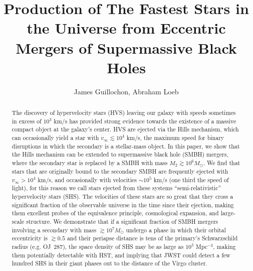\documentclass[a4paper,twocolumn]{emulateapj}
\begin{document}


\title{Production of The Fastest Stars in the Universe from Eccentric Mergers of Supermassive Black Holes}

\author{James Guillochon, Abraham Loeb}


\begin{abstract} 
The discovery of hypervelocity stars (HVS) leaving our galaxy with speeds sometimes in excess of $10^{3}$ km/s has provided strong evidence towards the existence of a massive compact object at the galaxy's center. HVS are ejected via the Hills mechanism, which can occasionally yield a star with $v_{\infty} \lesssim 10^4$ km/s, the maximum speed for binary disruptions in which the secondary is a stellar-mass object. In this paper, we show that the Hills mechanism can be extended to supermassive black hole (SMBH) mergers, where the secondary star is replaced by a SMBH with mass $M_2 \gtrsim 10^6 M_{\odot}$. We find that stars that are originally bound to the secondary SMBH are frequently ejected with $v_{\infty} > 10^4$ km/s, and occasionally with velocities $\sim 10^5$ km/s (one third the speed of light), for this reason we call stars ejected from these systems ``semi-relativistic'' hypervelocity stars (SHS). The velocities of these stars are so great that they cross a significant fraction of the observable universe in the time since their ejection, making them excellent probes of the equivalence principle, cosmological expansion, and large-scale structure. We demonstrate that if a significant fraction of SMBH mergers involving a secondary with mass $\gtrsim 10^7 M_\odot$ undergo a phase in which their orbital eccentricity is $\gtrsim 0.5$ and their periapse distance is tens of the primary's Schwarzschild radius (e.g. OJ~287), the space density of SHS may be as large as $10^{3}$ Mpc$^{-3}$, making them potentially detectable with HST, and implying that JWST could detect a few hundred SHS in their giant phases out to the distance of the Virgo cluster.
\end{abstract}

\end{document}
